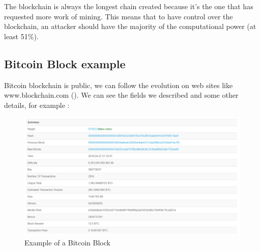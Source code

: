   The blockchain is always the longest chain created because it's the one that has requested more work of mining. This means that to have control over the blockchain, an attacker should have the majority of the computational power (at least 51\%).

    \subsection{Bitcoin Block example}

  Bitcoin blockchain is public, we can follow the evolution on web sites like www.blockchain.com (\cite{blockchain_web_site}). We can see the fields we described and some other details, for example : \newline

  \begin{figure}[h]
  \centering
  \includegraphics[width=15cm]{Figures/Block573522}
  \caption{Example of a Bitcoin Block}
  \end{figure}
